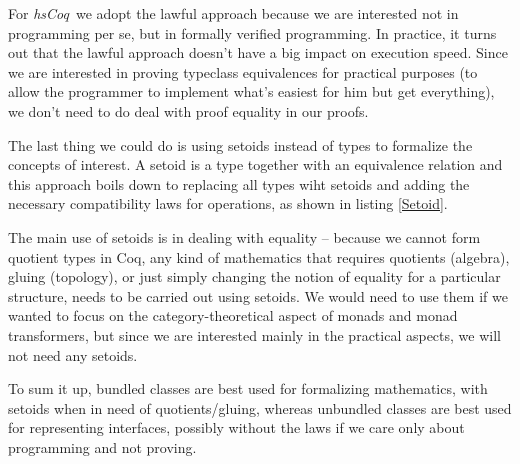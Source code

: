 \documentclass[declaration,inz,english,shortabstract]{iithesis}
\newcommand{\libname}{\textit{hsCoq}}
\begin{document}
For \libname\ we adopt the lawful approach because we are interested not in programming per se, but in formally verified programming. In practice, it turns out that the lawful approach doesn't have a big impact on execution speed. Since we are interested in proving typeclass equivalences for practical purposes (to allow the programmer to implement what's easiest for him but get everything), we don't need to do deal with proof equality in our proofs.


The last thing we could do is using setoids instead of types to formalize the concepts of interest. A setoid is a type together with an equivalence relation and this approach boils down to replacing all types wiht setoids and adding the necessary compatibility laws for operations, as shown in listing \ref{Setoid}.

The main use of setoids is in dealing with equality -- because we cannot form quotient types in Coq, any kind of mathematics that requires quotients (algebra), gluing (topology), or just simply changing the notion of equality for a particular structure, needs to be carried out using setoids. We would need to use them if we wanted to focus on the category-theoretical aspect of monads and monad transformers, but since we are interested mainly in the practical aspects, we will not need any setoids.

To sum it up, bundled classes are best used for formalizing mathematics, with setoids when in need of quotients/gluing, whereas unbundled classes are best used for representing interfaces, possibly without the laws if we care only about programming and not proving.
\end{document}
